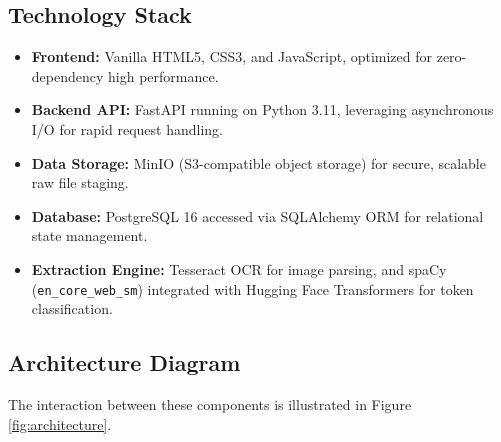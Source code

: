 \documentclass[12pt,a4paper]{article}
\begin{document}
\subsection{Technology Stack}
\begin{itemize}
    \item \textbf{Frontend:} Vanilla HTML5, CSS3, and JavaScript, optimized for zero-dependency high performance.
    \item \textbf{Backend API:} FastAPI running on Python 3.11, leveraging asynchronous I/O for rapid request handling.
    \item \textbf{Data Storage:} MinIO (S3-compatible object storage) for secure, scalable raw file staging.
    \item \textbf{Database:} PostgreSQL 16 accessed via SQLAlchemy ORM for relational state management.
    \item \textbf{Extraction Engine:} Tesseract OCR for image parsing, and spaCy (\texttt{en\_core\_web\_sm}) integrated with Hugging Face Transformers for token classification.
\end{itemize}

\subsection{Architecture Diagram}
The interaction between these components is illustrated in Figure \ref{fig:architecture}.
\end{document}
